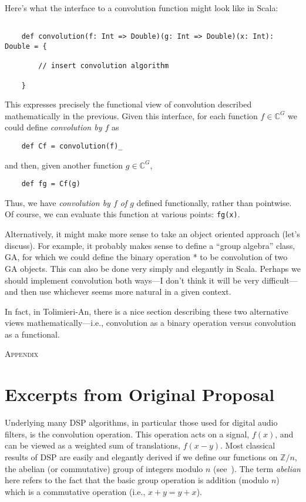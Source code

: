 \documentclass[11pt]{article}
\newcommand\C{\ensuremath{\mathbb{C}}}
\begin{document}
Here's what the interface to a convolution function might look like in Scala:
{\small
\begin{verbatim}
  
    def convolution(f: Int => Double)(g: Int => Double)(x: Int): Double = {

        // insert convolution algorithm

    }
\end{verbatim}}
\noindent This expresses precisely the functional view of convolution
described mathematically in the previous.  Given this interface, for each 
function $f \in \C^G$ we could define \emph{convolution by $f$} as
{\small
\begin{verbatim}
    def Cf = convolution(f)_
\end{verbatim}}
\noindent and then, given another function $g \in \C^G$, 
{\small
\begin{verbatim}
    def fg = Cf(g)
\end{verbatim}
}  
\noindent Thus, we have 
\emph{convolution by $f$ of $g$} defined functionally, rather than pointwise.
Of course, we can evaluate this function at various points: {\tt fg(x)}.

Alternatively, it might make more sense to take an object oriented approach (let's
discuss).  For example, it probably makes sense to define a ``group algebra''
class, GA, for which we could define the binary operation * to be convolution of
two GA objects.  This can also be done very simply and elegantly in Scala.
Perhaps we should implement convolution both ways---I don't think it will be
very difficult---and then use whichever seems more natural in a given context.

In fact, in Tolimieri-An, there is a nice section describing these two
alternative views mathematically---i.e., convolution as a binary
operation versus convolution as a functional.


\newpage

\appendix

\begin{center}
  \textsc{Appendix}
\end{center}
\section{Excerpts from Original Proposal}

Underlying many \ac{DSP} algorithms, in particular those
used for digital audio filters, is the convolution operation.  This operation
acts on a signal, $f(x)$, and can be viewed as a weighted sum of translations,
$f(x-y)$. Most classical results of \ac{DSP} are easily and elegantly derived if we
define our functions on $\mathbb{Z}/n$, the abelian (or commutative) group of
integers modulo $n$ (see~\cite{Tolimieri:1998}).
  The term \emph{abelian} here refers to the fact that the basic
group operation is addition (modulo $n$) which is a commutative operation (i.e.,
$x+y = y+x$).
\end{document}
